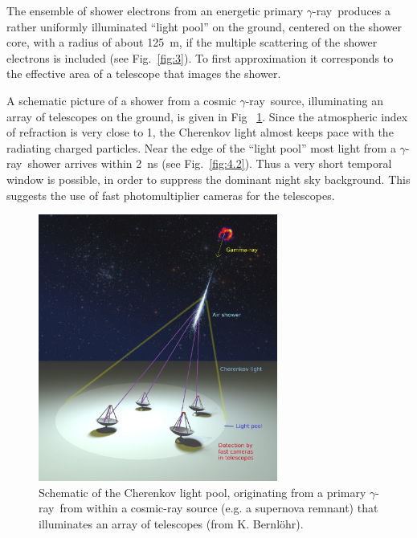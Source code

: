 \documentclass{svjour3x}                     %
\newcommand{\gr}{$\gamma$-ray}
\newcommand{\byKB}{ (from K. Bernl\"ohr)}
\begin{document}
The ensemble of shower electrons from an energetic primary \gr\ produces a
rather uniformly illuminated ``light pool'' on the ground, centered on the
shower core, with a radius of about 125~m, if the multiple scattering of the
shower electrons is included (see Fig.~\ref{fig:3}).  To first
approximation it corresponds to the effective area of a telescope that images
the shower.  

A schematic picture of a shower from a cosmic \gr\ source, illuminating an
array of telescopes on the ground, is given in Fig ~\ref{fig:4.1}. Since the
atmospheric index of refraction is very close to 1, the Cherenkov light almost
keeps pace with the radiating charged particles. Near the edge of the ``light
pool'' most light from a \gr\ shower arrives within 2~ns (see
Fig.~\ref{fig:4.2}). Thus a very short temporal window is possible, in order to
suppress the dominant night sky background. This suggests the use of fast
photomultiplier cameras for the telescopes.

\begin{figure}[ht]
\sidecaption
  \includegraphics[width=0.7\textwidth]{Arrayscheme2_x.eps}
  \caption[Schematic of the Cherenkov light pool]{Schematic of the Cherenkov light pool, originating from a primary
    \gr\ from within a cosmic-ray source (e.g. a supernova remnant) that
  illuminates an array of telescopes\byKB.}
\label{fig:4.1}       %
\end{figure}
\end{document}
